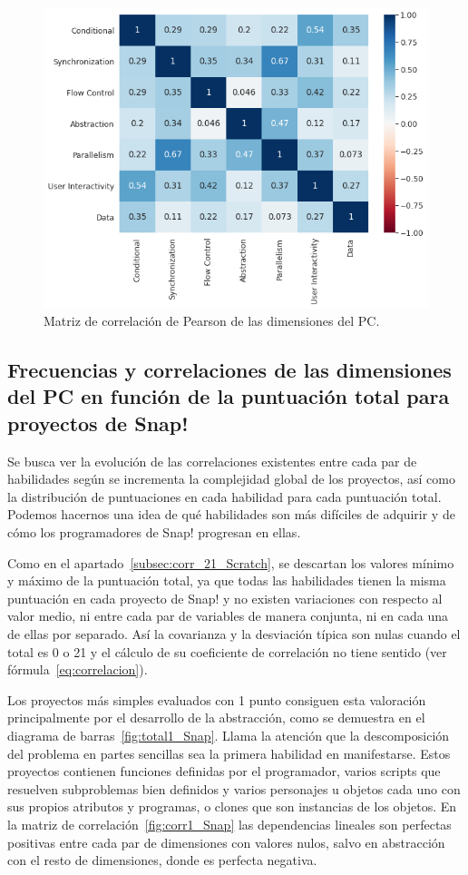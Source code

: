 \documentclass[a4paper, 12pt]{book}
\begin{document}
\begin{figure}[H]
    \centering
    \includegraphics[width=.7\textwidth]{img/corr_Snap.png}
    \caption{Matriz de correlación de Pearson de las dimensiones del PC.}\label{fig:corr_Snap}
\end{figure}

\subsection{Frecuencias y correlaciones de las dimensiones del PC en función de la puntuación total para proyectos de Snap!}
\label{subsec:corr_21_Snap}

Se busca ver la evolución de las correlaciones existentes entre cada par de habilidades según se incrementa la complejidad global de los proyectos, así como la distribución de puntuaciones en cada habilidad para cada puntuación total. Podemos hacernos una idea de qué habilidades son más difíciles de adquirir y de cómo los programadores de Snap! progresan en ellas.

Como en el apartado~\ref{subsec:corr_21_Scratch}, se descartan los valores mínimo y máximo de la puntuación total, ya que todas las habilidades tienen la misma puntuación en cada proyecto de Snap! y no existen variaciones con respecto al valor medio, ni entre cada par de variables de manera conjunta, ni en cada una de ellas por separado. Así la covarianza y la desviación típica son nulas cuando el total es 0 o 21 y el cálculo de su coeficiente de correlación no tiene sentido (ver fórmula~\eqref{eq:correlacion}). 

Los proyectos más simples evaluados con 1 punto consiguen esta valoración principalmente por el desarrollo de la abstracción, como se demuestra en el diagrama de barras~\ref{fig:total1_Snap}. Llama la atención que la descomposición del problema en partes sencillas sea la primera habilidad en manifestarse. Estos proyectos contienen funciones definidas por el programador, varios scripts que resuelven subproblemas bien definidos y varios personajes u objetos cada uno con sus propios atributos y programas, o clones que son instancias de los objetos. En la matriz de correlación~\ref{fig:corr1_Snap} las dependencias lineales son perfectas positivas entre cada par de dimensiones con valores nulos, salvo en abstracción con el resto de dimensiones, donde es perfecta negativa.
\end{document}
